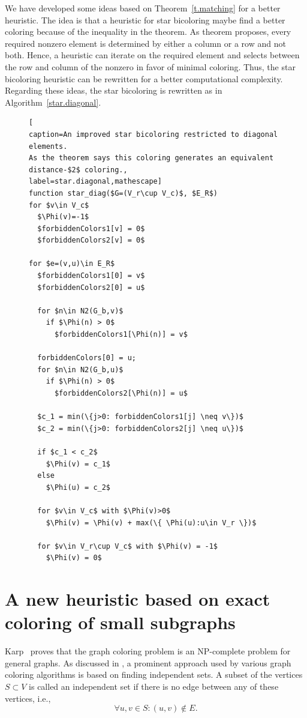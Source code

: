 \documentclass[12pt, twoside,a4paper,toc=bibliography]{scrbook}
\newcommand{\coderef}[1]{Algorithm~\protect\ref{#1}}
\begin{document}
We have developed some ideas based on Theorem~\ref{t.matching}
for a better heuristic. The idea is that a heuristic for star bicoloring maybe
find a better coloring because of the inequality in the theorem.
As theorem proposes, every required nonzero element
is determined by either a column or a row and not both. Hence, a heuristic
can iterate on the required element and selects between the row and column of
the nonzero in favor of minimal coloring.
Thus, the star bicoloring heuristic can be rewritten for a better computational complexity.
Regarding these ideas, the star bicoloring is rewritten as in \coderef{star.diagonal}.
\begin{figure}
\begin{lstlisting}[
caption=An improved star bicoloring restricted to diagonal elements.
As the theorem says this coloring generates an equivalent distance-$2$ coloring.,
label=star.diagonal,mathescape]
function star_diag($G=(V_r\cup V_c)$, $E_R$)
for $v\in V_c$
  $\Phi(v)=-1$
  $forbiddenColors1[v] = 0$
  $forbiddenColors2[v] = 0$

for $e=(v,u)\in E_R$
  $forbiddenColors1[0] = v$
  $forbiddenColors2[0] = u$

  for $n\in N2(G_b,v)$
    if $\Phi(n) > 0$
      $forbiddenColors1[\Phi(n)] = v$

  forbiddenColors[0] = u;
  for $n\in N2(G_b,u)$
    if $\Phi(n) > 0$
      $forbiddenColors2[\Phi(n)] = u$

  $c_1 = min(\{j>0: forbiddenColors1[j] \neq v\})$
  $c_2 = min(\{j>0: forbiddenColors2[j] \neq u\})$

  if $c_1 < c_2$
    $\Phi(v) = c_1$
  else
    $\Phi(u) = c_2$

  for $v\in V_c$ with $\Phi(v)>0$
    $\Phi(v) = \Phi(v) + max(\{ \Phi(u):u\in V_r \})$

  for $v\in V_r\cup V_c$ with $\Phi(v) = -1$
    $\Phi(v) = 0$
\end{lstlisting}
\end{figure}

\section{A new heuristic based on exact coloring of small subgraphs}
\label{s.exact}
Karp~\cite{karp:1972} proves that the graph coloring problem is an NP-complete problem
for general graphs.
As discussed in \cite{Fomin2013}, a prominent approach used by various graph coloring
algorithms is based on finding independent sets. A subset of the vertices $S\subset V$ is
called an independent set if there is no edge between any of these vertices, i.e.,
$$
\forall u,v\in S: (u,v)\notin E.
$$
\end{document}
